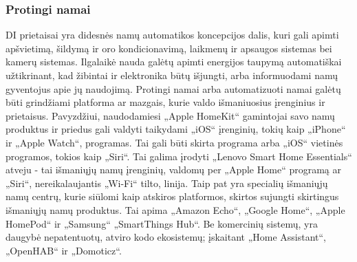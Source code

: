 \documentclass{VUMIFInfBakalaurinis}
\begin{document}
\subsubsection{Protingi namai}
DI prietaisai yra didesnės namų automatikos koncepcijos dalis, kuri gali apimti apšvietimą, šildymą ir oro kondicionavimą, laikmenų ir apsaugos sistemas bei kamerų sistemas.
Ilgalaikė nauda galėtų apimti energijos taupymą automatiškai užtikrinant, kad žibintai ir elektronika būtų išjungti, arba informuodami namų gyventojus apie jų naudojimą.
Protingi namai arba automatizuoti namai galėtų būti grindžiami platforma ar mazgais, kurie valdo išmaniuosius įrenginius ir prietaisus.
Pavyzdžiui, naudodamiesi „Apple HomeKit“ gamintojai savo namų produktus ir priedus gali valdyti taikydami „iOS“ įrenginių, tokių kaip „iPhone“ ir „Apple Watch“, programas.
Tai gali būti skirta programa arba „iOS“ vietinės programos, tokios kaip „Siri“.
Tai galima įrodyti „Lenovo Smart Home Essentials“ atveju - tai išmaniųjų namų įrenginių, valdomų per „Apple Home“ programą ar „Siri“, nereikalaujantis „Wi-Fi“ tilto, linija.
Taip pat yra specialių išmaniųjų namų centrų, kurie siūlomi kaip atskiros platformos, skirtos sujungti skirtingus išmaniųjų namų produktus.
Tai apima „Amazon Echo“, „Google Home“, „Apple HomePod“ ir „Samsung“ „SmartThings Hub“. Be komercinių sistemų, yra daugybė nepatentuotų, atviro kodo ekosistemų; įskaitant „Home Assistant“, „OpenHAB“ ir „Domoticz“. \cite{IOTWiki}
\end{document}
